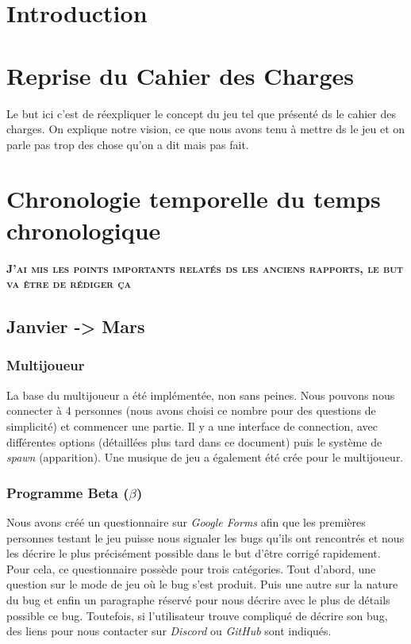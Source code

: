 \documentclass[a4paper,12pt]{article}
\begin{document}
  

    

    \newpage

    \tableofcontents

    \newpage

    \section*{Introduction}
    \lipsum[1-2]


    \section{Reprise du Cahier des Charges}
    Le but ici c'est de réexpliquer le concept du jeu tel que présenté ds le cahier des charges. 
    On explique notre vision, ce que nous avons tenu à mettre ds le jeu et on parle pas trop des
    chose qu'on a dit mais pas fait.
    \clearpage
    \newpage


    \section{Chronologie temporelle du temps chronologique}
    \textbf\textsc{J'ai mis les points importants relatés ds les anciens rapports, le but va être de rédiger ça}
        \subsection{Janvier -> Mars}
            \subsubsection{Multijoueur}
                La base du multijoueur a été implémentée, non sans peines. 
                Nous pouvons nous connecter à 4 personnes (nous avons choisi ce nombre pour des questions 
                de simplicité) et commencer une partie. Il y a une interface de connection, avec différentes 
                options (détaillées plus tard dans ce document) puis le système de \textit{spawn} (apparition).
                Une musique de jeu a également été crée pour le multijoueur.
  
            \subsubsection{Programme Beta (\(\beta\))}
                Nous avons créé un questionnaire sur \textsl{Google Forms} afin que les premières personnes testant
                le jeu puisse nous signaler les bugs qu'ils ont rencontrés et nous les décrire le plus 
                précisément possible dans le but d'être corrigé rapidement. Pour cela, ce questionnaire 
                possède pour trois catégories. Tout d'abord, une question sur le mode de jeu où le bug 
                s'est produit. Puis une autre sur la nature du bug et enfin un paragraphe réservé
                pour nous décrire avec le plus de détails possible ce bug. Toutefois, si l'utilisateur
                trouve compliqué de décrire son bug, des liens pour nous contacter sur \textsl{Discord} 
                ou \textsl{GitHub} sont indiqués.
        
\end{document}
